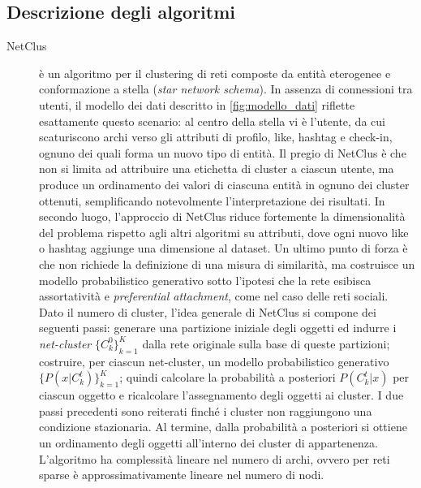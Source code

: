 \subsection{Descrizione degli algoritmi}
\begin{description}
\item[NetClus] \`e un algoritmo per il clustering di reti composte da entit\`a eterogenee e conformazione a stella (\textit{star network schema}). In assenza di connessioni tra utenti, il modello dei dati descritto in \autoref{fig:modello_dati} riflette esattamente questo scenario: al centro della stella vi \`e l'utente, da cui scaturiscono archi verso gli attributi di profilo, like, hashtag e check-in, ognuno dei quali forma un nuovo tipo di entit\`a. Il pregio di NetClus \`e che non si limita ad attribuire una etichetta di cluster a ciascun utente, ma produce un ordinamento dei valori di ciascuna entit\`a in ognuno dei cluster ottenuti, semplificando notevolmente l'interpretazione dei risultati.
In secondo luogo, l'approccio di NetClus riduce fortemente la dimensionalit\`a del problema rispetto agli altri algoritmi su attributi, dove ogni nuovo like o hashtag aggiunge una dimensione al dataset. Un ultimo punto di forza \`e che non richiede la definizione di una misura di similarit\`a, ma costruisce un modello probabilistico generativo sotto l'ipotesi che la rete esibisca assortativit\`a e \textit{preferential attachment}, come nel caso delle reti sociali. Dato il numero di cluster, l'idea generale di NetClus si compone dei seguenti passi: generare una partizione iniziale degli oggetti ed indurre i \textit{net-cluster} $\{C_{k}^{0}\}_{k=1}^{K}$ dalla rete originale sulla base di queste partizioni; costruire, per ciascun net-cluster, un modello probabilistico generativo $\{P(x|C_{k}^{t})\}_{k=1}^{K}$; quindi calcolare la probabilit\`a a posteriori $P(C_{k}^{t}|x)$ per ciascun oggetto e ricalcolare l'assegnamento degli oggetti ai cluster. I due passi precedenti sono reiterati finch\'e i cluster non raggiungono una condizione stazionaria. Al termine, dalla probabilit\`a a posteriori si ottiene un ordinamento degli oggetti all'interno dei cluster di appartenenza. L'algoritmo ha complessit\`a lineare nel numero di archi, ovvero per reti sparse \`e approssimativamente lineare nel numero di nodi.


\end{description}
